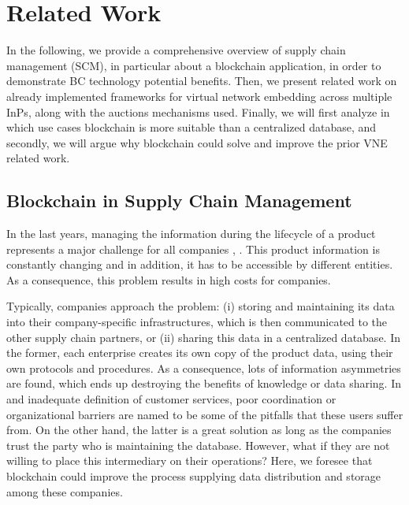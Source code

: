 \chapter{Related Work}
\label{ch:relatedwork}

In the following, we provide a comprehensive overview of supply chain management (SCM), in particular about a blockchain application, in order to demonstrate BC technology potential benefits. Then, we present related work on already implemented frameworks for virtual network embedding across multiple InPs, along with the auctions mechanisms used. Finally, we will first analyze in which use cases blockchain is more suitable than a centralized database, and secondly, we will argue why blockchain could solve and improve the prior VNE related work.

\section{Blockchain in Supply Chain Management}

In the last years, managing the information during the lifecycle of a product represents a major challenge for all companies \citep{karkkainen2003product}, \citep{tuttle2002you}. This product information is constantly changing and in addition, it has to be accessible by different entities. As a consequence, this problem results in high costs for companies. 

Typically, companies approach the problem: (i) storing and maintaining its data into their company-specific infrastructures, which is then communicated to the other supply chain partners, or (ii) sharing this data in a centralized database. In the former, each enterprise creates its own copy of the product data, using their own protocols and procedures.  As a consequence, lots of information asymmetries are found, which ends up destroying the benefits of knowledge or data sharing. In \citep{lee1992managing} and \citep{fiala2005information} inadequate definition of customer services, poor coordination or organizational barriers are named to be some of the pitfalls that these users suffer from. On the other hand, the latter is a great solution as long as the companies trust the party who is maintaining the database. However, what if they are not willing to place this intermediary on their operations? Here, we foresee that blockchain could improve the process supplying data distribution and storage among these companies.

